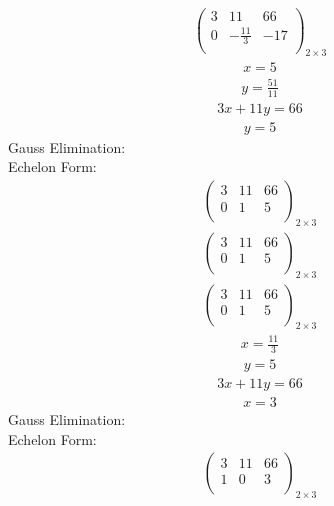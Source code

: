 \documentclass{article}
\begin{document}
\begin{align*}
\left(
\begin{array}{cc|c}
3 & 11 & 66\\
0 & -\frac{11}{3} & -17\\
\end{array}
\right)_{2\times 3}
\end{align*}
\begin{align*}
x=5\end{align*}
\begin{align*}
y=\frac{51}{11}\end{align*}
\begin{align*}
3x + 11y=66\end{align*}
\begin{align*}
y=5\end{align*}
Gauss Elimination:\\
Echelon Form:\\
\begin{align*}
\left(
\begin{array}{cc|c}
3 & 11 & 66\\
0 & 1 & 5\\
\end{array}
\right)_{2\times 3}
\end{align*}
\begin{align*}
\left(
\begin{array}{cc|c}
3 & 11 & 66\\
0 & 1 & 5\\
\end{array}
\right)_{2\times 3}
\end{align*}
\begin{align*}
\left(
\begin{array}{cc|c}
3 & 11 & 66\\
0 & 1 & 5\\
\end{array}
\right)_{2\times 3}
\end{align*}
\begin{align*}
x=\frac{11}{3}\end{align*}
\begin{align*}
y=5\end{align*}
\begin{align*}
3x + 11y=66\end{align*}
\begin{align*}
x=3\end{align*}
Gauss Elimination:\\
Echelon Form:\\
\begin{align*}
\left(
\begin{array}{cc|c}
3 & 11 & 66\\
1 & 0 & 3\\
\end{array}
\right)_{2\times 3}
\end{align*}
\end{document}
